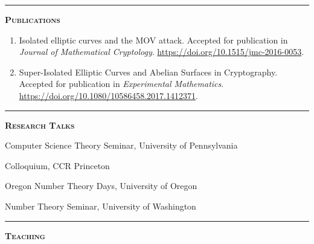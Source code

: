 \documentclass[12pt]{article}
\newcommand{\sectionheading}[1]
{
\bigskip %
\noindent
\hspace{-6.5mm}\textcolor{Gray}{\rule[.75mm]{21.5mm}{1mm}} %
\hspace{.2mm}	%
{\large{\textbf{\textsc{#1}}}} %
}
\newenvironment{date_section}
	{
	\vspace{-1ex}
	\leftmargini = 15ex
		\begin{itemize}[
			labelsep = *,
			labelwidth = 9ex,
			labelindent = 0ex,
			itemindent = !,
			font=\normalfont,
			align=parleft
		]{}
		\itemsep=-1.5mm
	}
	{\end{itemize}\vspace{-2ex}}
\newcommand{\yearmo}[2]{
	\item[
		{\makebox[1ex][r]{#1}}
		\hspace{1ex}
		{\makebox[1ex][l]{#2} }
		] }
\begin{document}
	\sectionheading{Publications}%
	
	\begin{enumerate}[itemsep=-1mm, leftmargin=24mm]
		
		\item
		{Isolated elliptic curves and the MOV attack}.
		Accepted for publication in \textit{Journal of Mathematical Cryptology}. 
		\url{https://doi.org/10.1515/jmc-2016-0053}.
		
		\item
		{Super-Isolated Elliptic Curves and Abelian Surfaces in Cryptography}.
		Accepted for publication in \textit{Experimental Mathematics}.
		\url{https://doi.org/10.1080/10586458.2017.1412371}.
		
	\end{enumerate}

	\sectionheading{Research Talks} %
	
	\begin{date_section}

		\yearmo{2018}{Feb.} %
		Computer Science Theory Seminar,
		University of Pennsylvania
		
		\yearmo{2018}{Feb.} %
		Colloquium,
		CCR Princeton
	
		\yearmo{2017}{Oct.} %
		Oregon Number Theory Days,
		University of Oregon
		
		\yearmo{2017}{May.} %
		Number Theory Seminar,
		University of Washington
		
	\end{date_section}


	\sectionheading{Teaching}%
	
\end{document}
